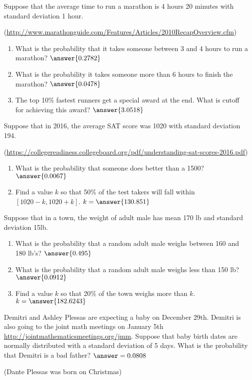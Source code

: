 \documentclass{ximera}
\begin{document}
\begin{problem}
Suppose that the average time to run a marathon is 4 hours 20 minutes with standard deviation 1 hour. 

 (\url{http://www.marathonguide.com/Features/Articles/2010RecapOverview.cfm})

\begin{enumerate}
\item What is the probability that it takes someone between 3 and 4 hours to run a marathon? $\answer{0.2782}$
\item What is the probability it takes someone more than 6 hours to finish the marathon? $\answer{0.0478}$
\item The top 10\% fastest runners get a special award at the end.  What is cutoff for achieving this award? $\answer{3.0518}$
\end{enumerate}


\end{problem}



\begin{problem}
Suppose that in 2016, the average SAT score was 1020 with standard deviation 194.

 (\url{https://collegereadiness.collegeboard.org/pdf/understanding-sat-scores-2016.pdf})

 \begin{enumerate}
\item What is the probability that someone does better than a 1500?  $\answer{0.0067}$
\item Find a value $k$ so that 50\% of the test takers will fall within $[1020-k, 1020+k]$.  $k=\answer{130.851}$
\end{enumerate}

 
\end{problem}



\begin{problem}
Suppose that in a town, the weight of adult male has mean 170 lb and standard deviation 15lb.

\begin{enumerate}
\item What is the probability that a random adult male weighs between 160 and 180 lb's? $\answer{0.495}$
\item What is the probability that a random adult male weighs less than 150 lb?  $\answer{0.0912}$
\item Find a value $k$ so that 20\% of the town weighs more than $k$.  $k=\answer{182.6243}$
\end{enumerate}


\end{problem}


\begin{problem}
Demitri and Ashley Plessas are expecting a baby on December 29th.  Demitri is also going to the joint math meetings on January 5th \url{http://jointmathematicsmeetings.org/jmm}.  Suppose that baby birth dates are normally distributed with a standard deviation of 5 days.  What is the probability that Demitri is a bad father?  $\answer={0.0808}$

(Dante Plessas was born on Christmas)


\end{problem}
\end{document}
